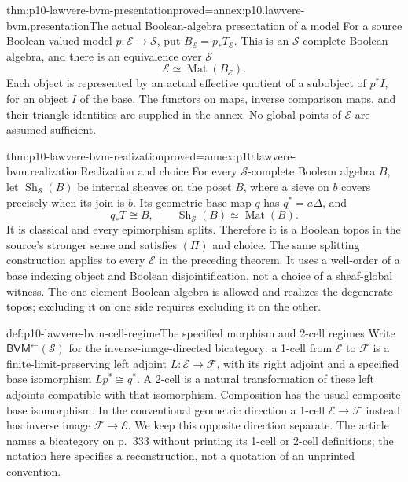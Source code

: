 \begin{hbtheorem}{thm:p10-lawvere-bvm-presentation}{proved=annex:p10.lawvere-bvm.presentation}{The actual Boolean-algebra presentation of a model}
For a source Boolean-valued model \(p:\mathcal E\to\mathcal S\),
put \(B_{\mathcal E}=p_*T_{\mathcal E}\). This is an
\(\mathcal S\)-complete Boolean algebra, and there is an equivalence
over \(\mathcal S\)
\[
             \mathcal E\simeq\operatorname{Mat}(B_{\mathcal E}).
\]
Each object is represented by an actual effective quotient of a subobject
of \(p^*I\), for an object \(I\) of the base. The functors on maps,
inverse comparison maps, and their triangle identities are supplied in
the annex. No global points of \(\mathcal E\) are assumed sufficient.
\end{hbtheorem}

\begin{hbtheorem}{thm:p10-lawvere-bvm-realization}{proved=annex:p10.lawvere-bvm.realization}{Realization and choice}
For every \(\mathcal S\)-complete Boolean algebra \(B\), let
\(\operatorname{Sh}_{\mathcal S}(B)\) be internal sheaves on the
poset \(B\), where a sieve on \(b\) covers precisely when its join
is \(b\). Its geometric base map \(q\) has
\(q^*=a\Delta\), and
\[
 q_*T\cong B,\qquad
 \operatorname{Sh}_{\mathcal S}(B)\simeq\operatorname{Mat}(B).
\]
It is classical and every epimorphism splits. Therefore it is a Boolean
topos in the source's stronger sense and satisfies \((\Pi)\) and choice.
The same splitting construction applies to every \(\mathcal E\) in
the preceding theorem. It uses a well-order of a base indexing object
and Boolean disjointification, not a choice of a sheaf-global witness.
The one-element Boolean algebra is allowed and realizes the degenerate
topos; excluding it on one side requires excluding it on the other.
\end{hbtheorem}

\begin{hbdefinition}{def:p10-lawvere-bvm-cell-regime}{The specified morphism and 2-cell regimes}
Write \(\mathsf{BVM}^{\leftarrow}(\mathcal S)\) for the
inverse-image-directed bicategory: a 1-cell from \(\mathcal E\) to
\(\mathcal F\) is a finite-limit-preserving left adjoint
\(L:\mathcal E\to\mathcal F\), with its right adjoint and a specified
base isomorphism \(Lp^*\cong q^*\). A 2-cell is a natural
transformation of these left adjoints compatible with that isomorphism.
Composition has the usual composite base isomorphism.
In the conventional geometric direction a 1-cell
\(\mathcal E\to\mathcal F\) instead has inverse image
\(\mathcal F\to\mathcal E\). We keep this opposite direction
separate. The article names a bicategory on p.~333 without printing its
1-cell or 2-cell definitions; the notation here specifies a reconstruction,
not a quotation of an unprinted convention.
\end{hbdefinition}

